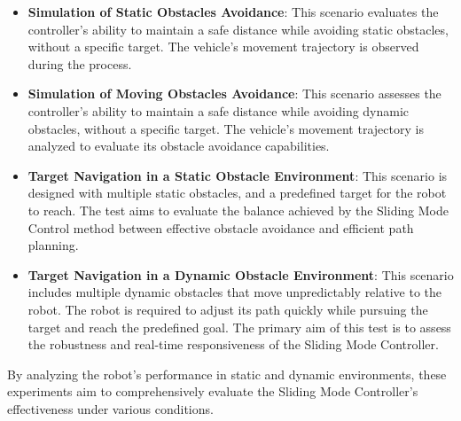 \begin{itemize}
    \item \textbf{Simulation of Static Obstacles Avoidance}: This scenario evaluates the controller's ability to maintain a safe distance while avoiding static obstacles, without a specific target. The vehicle's movement trajectory is observed during the process.

    \item \textbf{Simulation of Moving Obstacles Avoidance}: This scenario assesses the controller's ability to maintain a safe distance while avoiding dynamic obstacles, without a specific target. The vehicle's movement trajectory is analyzed to evaluate its obstacle avoidance capabilities.

    \item \textbf{Target Navigation in a Static Obstacle Environment}: This scenario is designed with multiple static obstacles, and a predefined target for the robot to reach. The test aims to evaluate the balance achieved by the Sliding Mode Control method between effective obstacle avoidance and efficient path planning.

    \item \textbf{Target Navigation in a Dynamic Obstacle Environment}: This scenario includes multiple dynamic obstacles that move unpredictably relative to the robot. The robot is required to adjust its path quickly while pursuing the target and reach the predefined goal. The primary aim of this test is to assess the robustness and real-time responsiveness of the Sliding Mode Controller.
\end{itemize}

By analyzing the robot's performance in static and dynamic environments, these experiments aim to comprehensively evaluate the Sliding Mode Controller's effectiveness under various conditions.
